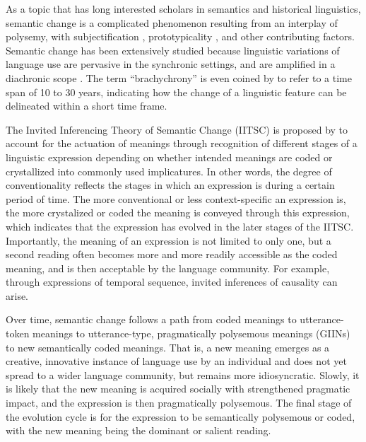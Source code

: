 As a topic that has long interested scholars in semantics and historical linguistics, semantic change is a complicated phenomenon resulting from an interplay of polysemy, with subjectification \parencite{traugott2001regularity}, prototypicality \parencite{geeraerts1997diachronic}, and other contributing factors. Semantic change has been extensively studied because linguistic variations of language use are pervasive in the synchronic settings, and are amplified in a diachronic scope \parencite{semanticincrowley2010,bowern2019semantic}. The term ``brachychrony'' is even coined by \textcite{mair1998corpora} to refer to a time span of 10 to 30 years, indicating how the change of a linguistic feature can be delineated within a short time frame.

The Invited Inferencing Theory of Semantic Change (IITSC) is proposed by \textcite[34-40]{traugott2001regularity} to account for the actuation of meanings through recognition of different stages of a linguistic expression depending on whether intended meanings are coded or crystallized into commonly used implicatures. In other words, the degree of conventionality reflects the stages in which an expression is during a certain period of time. The more conventional or less context-specific an expression is, the more crystalized or coded the meaning is conveyed through this expression, which indicates that the expression has evolved in the later stages of the IITSC. Importantly, the meaning of an expression is not limited to only one, but a second reading often becomes more and more readily accessible as the coded meaning, and is then acceptable by the language community. For example, through expressions of temporal sequence, invited inferences of causality can arise.

Over time, semantic change follows a path from coded meanings to utterance­-token meanings to utterance-­type, pragmatically polysemous meanings (GIINs) to new semantically coded meanings. That is, a new meaning emerges as a creative, innovative instance of language use by an individual and does not yet spread to a wider language community, but remains more idiosyncratic. Slowly, it is likely that the new meaning is acquired socially with strengthened pragmatic impact, and the expression is then pragmatically polysemous. The final stage of the evolution cycle is for the expression to be semantically polysemous or coded, with the new meaning being the dominant or salient reading.

